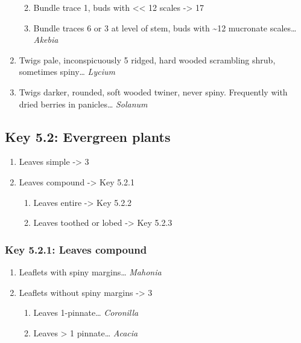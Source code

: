 \documentclass[openany]{book}
\providecommand{\tightlist}{%
  \setlength{\itemsep}{0pt}\setlength{\parskip}{0pt}}
\begin{document}
\begin{enumerate}
  \begin{enumerate}
  \def\labelenumii{\arabic{enumii}.}
  \setcounter{enumii}{14}
  \tightlist
  \item
    Bundle trace 1, buds with \textless{}\textless{} 12 scales
    -\textgreater{} 17
  \item
    Bundle traces 6 or 3 at level of stem, buds with \textasciitilde{}12
    mucronate scales\ldots{} \emph{Akebia}
  \end{enumerate}
\item
  Twigs pale, inconspicuously 5 ridged, hard wooded scrambling shrub,
  sometimes spiny\ldots{} \emph{Lycium}
\item
  Twigs darker, rounded, soft wooded twiner, never spiny. Frequently
  with dried berries in panicles\ldots{} \emph{Solanum}
\end{enumerate}

\hypertarget{key-5.2-evergreen-plants}{%
\subsection{Key 5.2: Evergreen plants}\label{key-5.2-evergreen-plants}}

\begin{enumerate}
\def\labelenumi{\arabic{enumi}.}
\tightlist
\item
  Leaves simple -\textgreater{} 3
\item
  Leaves compound -\textgreater{} Key 5.2.1

  \begin{enumerate}
  \def\labelenumii{\arabic{enumii}.}
  \setcounter{enumii}{2}
  \tightlist
  \item
    Leaves entire -\textgreater{} Key 5.2.2
  \item
    Leaves toothed or lobed -\textgreater{} Key 5.2.3
  \end{enumerate}
\end{enumerate}

\hypertarget{key-5.2.1-leaves-compound}{%
\subsubsection{Key 5.2.1: Leaves
compound}\label{key-5.2.1-leaves-compound}}

\begin{enumerate}
\def\labelenumi{\arabic{enumi}.}
\tightlist
\item
  Leaflets with spiny margins\ldots{} \emph{Mahonia}
\item
  Leaflets without spiny margins -\textgreater{} 3

  \begin{enumerate}
  \def\labelenumii{\arabic{enumii}.}
  \setcounter{enumii}{2}
  \tightlist
  \item
    Leaves 1-pinnate\ldots{} \emph{Coronilla}
  \item
    Leaves \textgreater{} 1 pinnate\ldots{} \emph{Acacia}
  \end{enumerate}
\end{enumerate}
\end{document}
